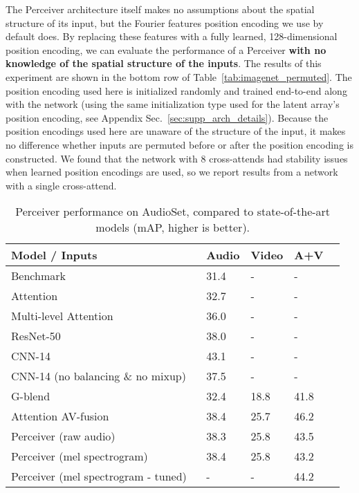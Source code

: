 \documentclass{article}
\begin{document}
The Perceiver architecture itself makes no assumptions about the spatial structure of its input, but the Fourier features position encoding we use by default does. By replacing these features with a fully learned, 128-dimensional position encoding, we can evaluate the performance of a Perceiver \textbf{with no knowledge of the spatial structure of the inputs}. The results of this experiment are shown in the bottom row of Table~\ref{tab:imagenet_permuted}. The position encoding used here is initialized randomly and trained end-to-end along with the network (using the same initialization type used for the latent array's position encoding, see Appendix Sec.~\ref{sec:supp_arch_details}). Because the position encodings used here are unaware of the structure of the input, it makes no difference whether inputs are permuted before or after the position encoding is constructed. We found that the network with 8 cross-attends had stability issues when learned position encodings are used, so we report results from a network with a single cross-attend.

\begin{table*}[]
\centering
\begin{tabular}{|l|l|l|l|l|}
\hline
Model / Inputs                                      & Audio        & Video         & A+V            \\ \hline
Benchmark~\cite{gemmeke2017audio}                   & 31.4         &  -            &  -             \\ 
Attention~\cite{kong2018audio}                      & 32.7         & -             & -              \\ 
Multi-level Attention ~\cite{yu2018multi}           & 36.0         & -             & -              \\ 
ResNet-50~\cite{ford2019deep}                       & 38.0         &  -            &  -             \\ 
CNN-14~\cite{kong2020panns}                         & 43.1         &  -            &  -             \\
CNN-14 (no balancing \& no mixup) ~\cite{kong2020panns} & 37.5       &  -            &  -             \\ \hline
G-blend~\cite{wang2020makes}                        & 32.4         & 18.8          & 41.8           \\
Attention AV-fusion~\cite{fayek2020large}           & 38.4         & 25.7          & 46.2           \\ \hline
Perceiver (raw audio) & 38.3 & 25.8 & 43.5 \\
Perceiver (mel spectrogram) & 38.4 & 25.8 & 43.2 \\ 
Perceiver (mel spectrogram - tuned) & - & - & 44.2 \\ \hline
\end{tabular}
\caption{Perceiver performance on AudioSet, compared to state-of-the-art models (mAP, higher is better).}
\label{tbl:audioset}
\vspace{-8pt}
\end{table*}
\end{document}
